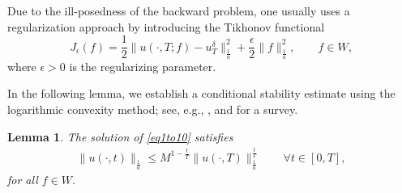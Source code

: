 \documentclass[reqno]{amsart}
\theoremstyle{plain}
\newtheorem{lemma}[theorem]{Lemma}
\theoremstyle{remark}
\numberwithin{equation}{section}
\begin{document}
Due to the ill-posedness of the backward problem, one usually uses a regularization approach by introducing the Tikhonov functional
$$ J_{\epsilon}(f)= \frac{1}{2}\|u(\cdot,T;f)-u^{\delta}_T\|^2_{\frac{1}{a}}+\frac{\epsilon}{2}\|f\|^2_{\frac{1}{a}}, \qquad f\in W,$$
where $\epsilon>0$ is the regularizing parameter.

In the following lemma, we establish a conditional stability estimate using the logarithmic convexity method; see, e.g., \cite{Payne}, and \cite{Car18} for a survey.
\begin{lemma}
The solution of \eqref{eq1to10} satisfies 
    \begin{align}\label{convx}
        \|u(\cdot,t)\|_{\frac{1}{a}}\leqslant M^{1-\frac{t}{T}}\|u(\cdot,T)\|_{\frac{1}{a}}^{\frac{t}{T}} \qquad \forall t \in [0,T],
    \end{align}
for all $f\in W.$
\end{lemma}
\end{document}
